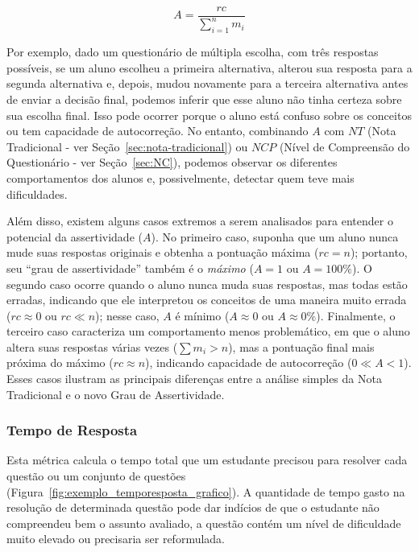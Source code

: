 \begin{equation}
\label{eq:A}
A = \frac{rc}{\sum_{i=1}^{n} m_i}
\end{equation}

Por exemplo, dado um questionário de múltipla escolha, com três respostas possíveis, se um aluno escolheu a primeira alternativa, alterou sua resposta para a segunda alternativa e, depois, mudou novamente para a terceira alternativa antes de enviar a decisão final, podemos inferir que esse aluno não tinha certeza sobre sua escolha final. Isso pode ocorrer porque o aluno está confuso sobre os conceitos ou tem capacidade de autocorreção. No entanto, combinando $A$ com $NT$ (Nota Tradicional - ver Seção~\ref{sec:nota-tradicional}) ou $NCP$ (Nível de Compreensão do Questionário - ver Seção~\ref{sec:NC}), podemos observar os diferentes comportamentos dos alunos e, possivelmente, detectar quem teve mais dificuldades.

Além disso, existem alguns casos extremos a serem analisados para entender o potencial da assertividade ($A$). No primeiro caso, suponha que um aluno nunca mude suas respostas originais e obtenha a pontuação máxima ($rc=n$); portanto, seu ``grau de assertividade'' também é o \textit{máximo} ($A = 1$ ou $A = 100\%$). O segundo caso ocorre quando o aluno nunca muda suas respostas, mas todas estão erradas, indicando que ele interpretou os conceitos de uma maneira muito errada ($rc \approx 0 $ ou $ rc \ll n $); nesse caso, $A$ é mínimo ($A \approx 0$ ou $A \approx 0\%$). Finalmente, o terceiro caso caracteriza um comportamento menos problemático, em que o aluno altera suas respostas várias vezes ($\sum m_i > n$), mas a pontuação final mais próxima do máximo ($rc \approx n$), indicando capacidade de autocorreção ($0 \ll A < 1$). Esses casos ilustram as principais diferenças entre a análise simples da Nota Tradicional e o novo Grau de Assertividade.


\subsubsection{Tempo de Resposta}\label{section:Tempo}
Esta métrica calcula o tempo total que um estudante precisou para resolver cada questão ou um conjunto de questões (Figura~\ref{fig:exemplo_temporesposta_grafico}). A quantidade de tempo gasto na resolução de determinada questão pode dar indícios de que o estudante não compreendeu bem o assunto avaliado, a questão contém um nível de dificuldade muito elevado ou precisaria ser reformulada.

